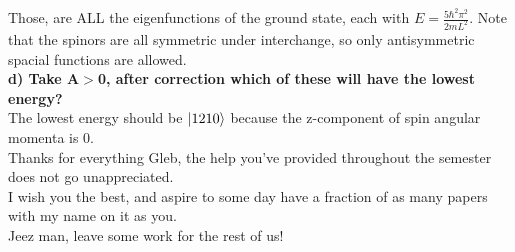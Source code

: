 \documentclass{journal}
\begin{document}
Those, are ALL the eigenfunctions of the ground state, each with $E=\frac{5\hbar^2\pi^2}{2mL^2}$. Note that the spinors are all symmetric under interchange, so only antisymmetric spacial functions are allowed.\\
\textbf{d) Take A}$>$\textbf{0, after correction which of these will have the lowest energy?}\\
The lowest energy should be $\ket{1210}$ because the z-component of spin angular momenta is 0.\\

Thanks for everything Gleb, the help you've provided throughout the semester does not go unappreciated.\\ 

I wish you the best, and aspire to some day have a fraction of as many papers with my name on it as you.\\ Jeez man, leave some work for the rest of us!
\end{document}
